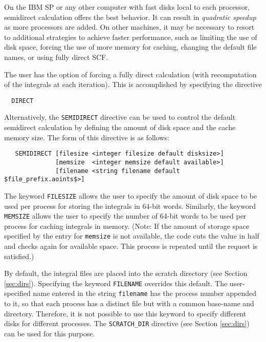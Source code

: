 
On the IBM SP or any other computer with fast disks local to each
processor, semidirect calculation offers the best behavior.  It can
result in {\em quadratic speedup} as more processors are added.  On
other machines, it may be necessary to resort to additional strategies
to achieve faster performance, such as limiting the use of disk space,
forcing the use of more memory for caching, changing the default file
names, or using fully direct SCF.

The user has the option of forcing a fully direct calculation (with
recomputation of the integrals at each iteration).  This is
accomplished by specifying the directive

\begin{verbatim}
  DIRECT
\end{verbatim}

Alternatively, the \verb+SEMIDIRECT+ directive can be used to control
the default semidirect calculation by defining the amount of disk
space and the cache memory size.  The form of this directive is as
follows:

\begin{verbatim}
   SEMIDIRECT [filesize <integer filesize default disksize>] 
              [memsize  <integer memsize default available>]
              [filename <string filename default $file_prefix.aoints$>]
\end{verbatim}

The keyword \verb+FILESIZE+ allows the user to specify the amount of
disk space to be used per process for storing the integrals in 64-bit
words.  Similarly, the keyword \verb+MEMSIZE+ allows the user to
specify the number of 64-bit words to be used per process for caching
integrals in memory. (Note: If the amount of storage space specified
by the entry for \verb+memsize+ is not available, the code cuts the
value in half and checks again for available space.  This process is
repeated until the request is satisfied.)

By default, the integral files are placed into the scratch directory
(see Section \ref{sec:dirs}). Specifying the keyword \verb+FILENAME+
overrides this default.  The user-specified name entered in the string
\verb+filename+ has the process number appended to it, so that each
process has a distinct file but with a common base-name and directory.
Therefore, it is not possible to use this keyword to specify different
disks for different processes.  The \verb+SCRATCH_DIR+ directive (see
Section \ref{sec:dirs}) can be used for this purpose.

